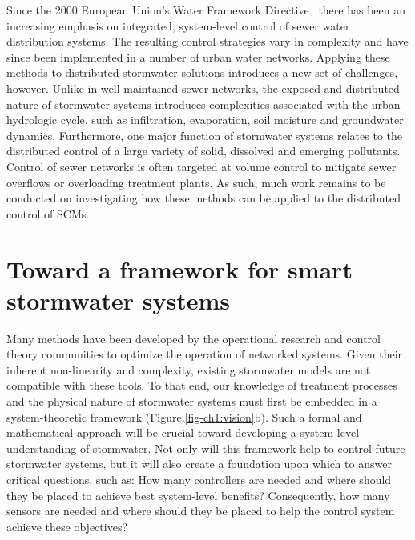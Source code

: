 Since the 2000 European Union's Water Framework Directive~\cite{TheEuropeanParliamentandthecouncilofEuropeanUnion2000DirectivePolicy} there has been an increasing emphasis on integrated, system-level control of sewer water distribution systems.
The resulting control strategies vary in complexity\cite{Benedetti2009AScale,Seggelke2013ImplementationWilhelmshaven,Fiorelli2013OptimisedFunction}  and have since been implemented in a number of urban water networks\cite{Mollerup2016}.
Applying these methods to distributed stormwater solutions introduces a new set of challenges, however. Unlike in well-maintained sewer networks, the exposed and distributed  nature of stormwater systems introduces complexities associated with the urban hydrologic cycle, such as infiltration, evaporation, soil moisture and groundwater dynamics. Furthermore, one major function of stormwater systems relates to the  distributed control of  a large variety of solid, dissolved and emerging pollutants. Control of sewer networks is often targeted at volume control to mitigate sewer overflows or overloading treatment plants. As such, much work remains to be conducted on investigating how these methods can be applied to the distributed control of SCMs. 



\section{Toward a framework for smart stormwater systems}
 
Many methods have been developed by the operational research and control theory communities to optimize the operation of networked systems\cite{Sheffi1984UrbanNetworks,Astrom2006FeedbackEngineers}. Given their inherent non-linearity and complexity, existing stormwater models are not compatible with these tools. To that end, our knowledge of treatment processes and the physical nature of stormwater systems must first be embedded in a system-theoretic framework (Figure.\ref{fig-ch1:vision}b). Such a formal and mathematical approach will be crucial toward developing a system-level understanding of stormwater. Not only will this framework help to control future stormwater systems, but it will also create a foundation upon which to answer critical questions, such as: How many controllers are needed and where should they be placed to achieve best system-level benefits?  Consequently, how many sensors are needed and where should they be placed to help the control system achieve these objectives? 

